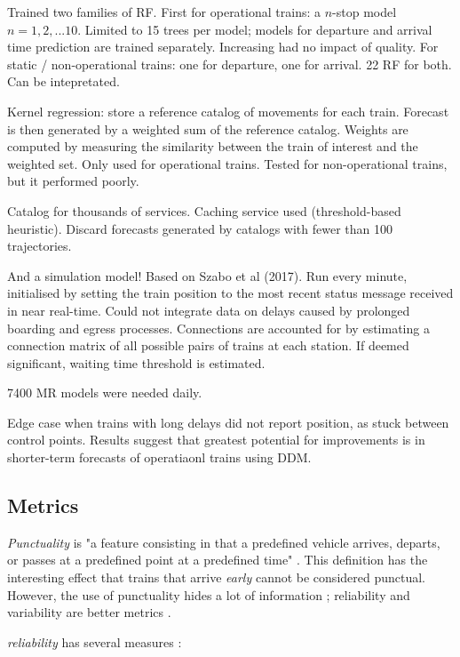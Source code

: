 \documentclass{article}
\begin{document}
Trained two families of RF. First for operational trains: a $n$-stop model $n = 1, 2, ... 10$. Limited to 15 trees per model; models for departure and arrival time prediction are trained separately. Increasing had no impact of quality. For static / non-operational trains: one for departure, one for arrival. 22 RF for both. Can be intepretated. 

Kernel regression: store a reference catalog of movements for each train. Forecast is then generated by a weighted sum of the reference catalog. Weights are computed by measuring the similarity between the train of interest and the weighted set. Only used for operational trains. Tested for non-operational trains, but it performed poorly. 

Catalog for thousands of services. Caching service used (threshold-based heuristic). Discard forecasts generated by catalogs with fewer than 100 trajectories.

And a simulation model! Based on Szabo et al (2017). Run every minute, initialised by setting the train position to the most recent status message received in near real-time. Could not integrate data on delays caused by prolonged boarding and egress processes. Connections are accounted for by estimating a connection matrix of all possible pairs of trains at each station. If deemed significant, waiting time threshold is estimated. 

7400 MR models were needed daily. 

Edge case when trains with long delays did not report position, as stuck between control points. Results suggest that greatest potential for improvements is in shorter-term forecasts of operatiaonl trains using DDM. 

\subsection{Metrics}

\textit{Punctuality} is "a feature consisting in that a predefined vehicle arrives, departs, or passes at a predefined point at a predefined time" \cite{rudnicki_1997}. This definition has the interesting effect that trains 
that arrive \textit{early} cannot be considered punctual. However, the use of punctuality hides a lot of information \cite{skagestad_2004}; reliability and variability are better metrics \cite{olsson_haugland_2004}.

\textit{reliability} has several measures \cite{rietveld_bruinsma_van_vuuren_2001}:
\end{document}
